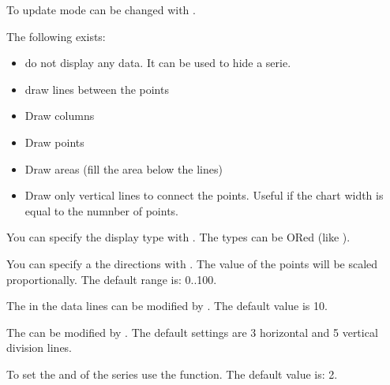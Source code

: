 \documentclass[letterpaper,10pt,english]{sphinxmanual}
\begin{document}
To update mode can be changed with .

The following  exists:
\begin{itemize}
\item {} 
 do not display any data. It can be used to hide a serie.

\item {} 
 draw lines between the points

\item {} 
 Draw columns

\item {} 
 Draw points

\item {} 
 Draw areas (fill the area below the lines)

\item {} 
 Draw only vertical lines to connect the points. Useful if the chart width is equal to the numnber of points.

\end{itemize}

You can specify the display type with . The types can be ORed (like ).

You can specify a the  directions with . The value of the points will be scaled proportionally. The default range is: 0..100.

The  in the data lines can be modified by . The default value is 10.

The   can be modified by . The default settings are 3 horizontal and 5 vertical division lines.

To set the  and  of the series use the  function. The default value is: 2.
\end{document}
